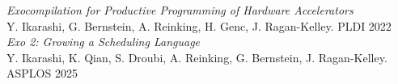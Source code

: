 \textit{Exocompilation for Productive Programming of Hardware Accelerators}\\
Y. Ikarashi, G. Bernstein, A. Reinking, H. Genc, J. Ragan-Kelley.
PLDI 2022\\
\textit{Exo 2: Growing a Scheduling Language}\\
Y. Ikarashi, K. Qian, S. Droubi, A. Reinking, G. Bernstein, J. Ragan-Kelley.
ASPLOS 2025 
